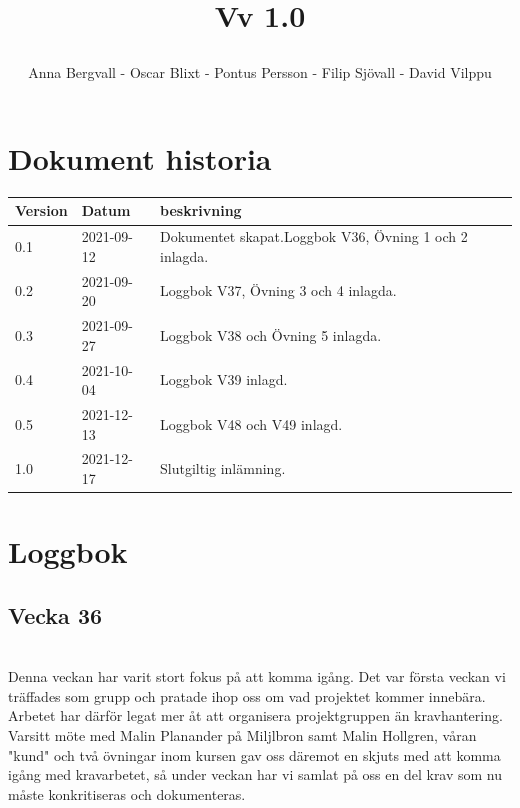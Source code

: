 \documentclass[12pt]{article}
\date {#1}
\title {
    \documentNumber {01}    

    \documentTitle {Helsingborg Event and Convention Bureau}
    
    \documentDate {2021-12-17}
    \documentVersion Vv 1.0
    
    \author{Anna Bergvall - Oscar Blixt - Pontus Persson - Filip Sjövall - David Vilppu}
}
\begin{document}
\maketitle

\thispagestyle{empty}



\newpage

\tableofcontents


\newpage

\section{Dokument historia}
\begin{tabular}{ l | l | l }
    Version & Datum & beskrivning \\
    \hline
    0.1 & 2021-09-12 & Dokumentet skapat.Loggbok V36, Övning 1 och 2 inlagda. \\
    \hline
    0.2 & 2021-09-20 & Loggbok V37, Övning 3 och 4 inlagda.
    \\
    \hline
    0.3 & 2021-09-27 & Loggbok V38 och Övning 5 inlagda.
    \\
    \hline
    0.4 & 2021-10-04 & Loggbok V39 inlagd.
     \\
    \hline
    0.5 & 2021-12-13 & Loggbok V48 och V49 inlagd.
    \\
    \hline
    1.0 & 2021-12-17 & Slutgiltig inlämning.
    \\
\end{tabular}

\newpage

\section{Loggbok}
    \subsection{Vecka 36}
    \\
    Denna veckan har varit stort fokus på att komma igång. Det var första veckan vi träffades som grupp och pratade ihop oss om vad projektet kommer innebära. Arbetet har därför legat mer åt att organisera projektgruppen än kravhantering. \\ Varsitt möte med Malin Planander på Miljlbron samt Malin Hollgren, våran "kund" och två övningar inom kursen gav oss däremot en skjuts med att komma igång med kravarbetet, så under veckan har vi samlat på oss en del krav som nu måste konkritiseras och dokumenteras. 
    
\end{document}

